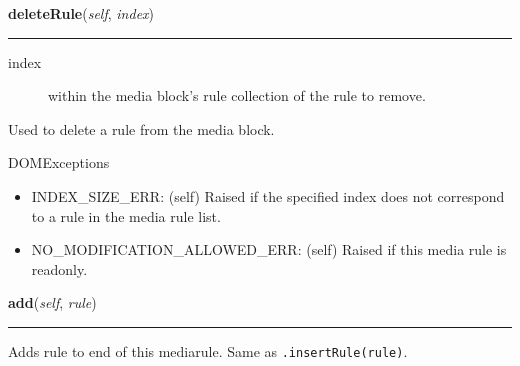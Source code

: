     \vspace{0.5ex}

\hspace{.8\funcindent}\begin{boxedminipage}{\funcwidth}

    \raggedright \textbf{deleteRule}(\textit{self}, \textit{index})

    \vspace{-1.5ex}

    \rule{\textwidth}{0.5\fboxrule}
\setlength{\parskip}{2ex}
\begin{description}
\item[{index}] \leavevmode 
within the media block's rule collection of the rule to remove.

\end{description}

Used to delete a rule from the media block.

DOMExceptions
\begin{itemize}
\item {} 
INDEX{\_}SIZE{\_}ERR: (self)
Raised if the specified index does not correspond to a rule in
the media rule list.

\item {} 
NO{\_}MODIFICATION{\_}ALLOWED{\_}ERR: (self)
Raised if this media rule is readonly.

\end{itemize}
\setlength{\parskip}{1ex}
    \end{boxedminipage}

    \label{cssutils:css:cssmediarule:CSSMediaRule:add}

    \vspace{0.5ex}

\hspace{.8\funcindent}\begin{boxedminipage}{\funcwidth}

    \raggedright \textbf{add}(\textit{self}, \textit{rule})

    \vspace{-1.5ex}

    \rule{\textwidth}{0.5\fboxrule}
\setlength{\parskip}{2ex}

Adds rule to end of this mediarule. Same as \texttt{.insertRule(rule)}.
\setlength{\parskip}{1ex}
    \end{boxedminipage}

